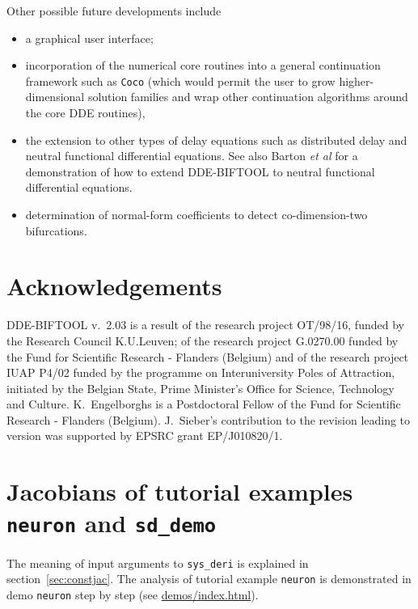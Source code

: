 \documentclass[10pt]{scrartcl}
\newcommand{\DDEBIFCODE}{\textsc{DDE-BIFTOOL}}
\newcommand{\demobase}{\url{demos/index.html}}
\newcommand{\blist}[1]{\mbox{\lstinline!#1!}}
\begin{document}
{Other possible future developments include
\begin{itemize}
\item a graphical user interface;
\item incorporation of the numerical core
  routines into a general continuation framework such as \texttt{Coco}
  \cite{DS13} (which would permit the user to grow higher-dimensional
  solution families and wrap other continuation algorithms around the
  core DDE routines),
\item the extension to other types of delay equations such as
  distributed delay and neutral functional differential equations. See
  also Barton \emph{et al} \cite{Barton06} for a demonstration of how
  to extend \DDEBIFCODE{} to neutral functional differential
  equations.
\item determination of normal-form coefficients to detect
  co-dimension-two bifurcations.
\end{itemize}
\section*{Acknowledgements}

\DDEBIFCODE{} v.~2.03 is a result of the research project OT/98/16,
funded by the Research Council K.U.Leuven; of the research project
G.0270.00 funded by the Fund for Scientific Research - Flanders
(Belgium) and of the research project IUAP P4/02 funded by the
programme on Interuniversity Poles of Attraction, initiated by the
Belgian State, Prime Minister's Office for Science, Technology and
Culture.  K.~Engelborghs is a Postdoctoral Fellow of the Fund for
Scientific Research - Flanders (Belgium).  J.~Sieber's contribution to
the revision leading to version \version{} was supported by EPSRC
grant EP/J010820/1.





\newpage
\appendix

\section{Jacobians of tutorial examples \blist{neuron} and \blist{sd_demo}}
\label{sec:sys:deri}
The meaning of input arguments to \blist{sys_deri} is explained in
section~\ref{sec:constjac}. The analysis of tutorial example
\blist{neuron} is demonstrated in demo \texttt{neuron} step by step
(see \demobase{}).

}
\end{document}
